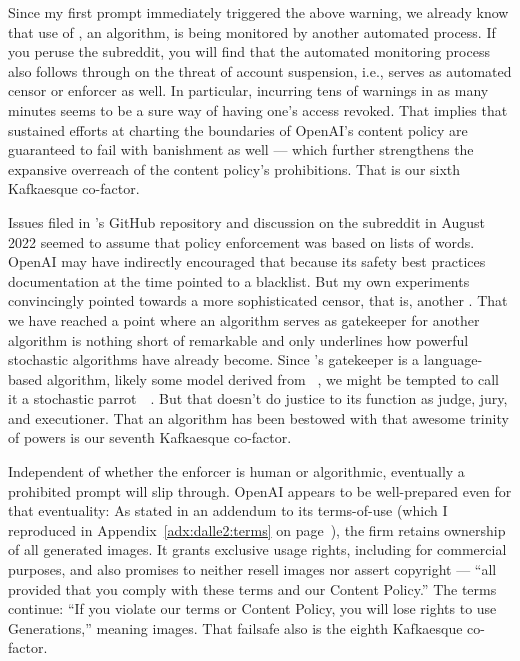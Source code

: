 Since my first prompt immediately triggered the above warning, we already know
that use of \DALLE, an algorithm, is being monitored by another automated
process. If you peruse the \DALLE{} subreddit, you will find that the automated
monitoring process also follows through on the threat of account suspension,
i.e., serves as automated censor or enforcer as well. In particular, incurring
tens of warnings in as many minutes seems to be a sure way of having one's
access revoked. That implies that sustained efforts at charting the boundaries
of OpenAI's content policy are guaranteed to fail with banishment as well —
which further strengthens the expansive overreach of the content policy's
prohibitions. That is our sixth Kafkaesque co-factor.

Issues filed in \DALLE's GitHub repository and discussion on the subreddit in
August 2022 seemed to assume that policy enforcement was based on lists of
words. OpenAI may have indirectly encouraged that because its safety best
practices documentation at the time pointed to a  blacklist. But my own
experiments convincingly pointed towards a more sophisticated censor, that is,
another \AI. That we have reached a point where an algorithm serves as
gatekeeper for another algorithm is nothing short of remarkable and only
underlines how powerful stochastic algorithms have already become. Since
\DALLE's gatekeeper is a language-based algorithm, likely some model derived
from \GPT~\cite{BrownMannea2020}, we might be tempted to call it a stochastic
parrot~~\cite{BenderGebruea2021}. But that doesn't do justice to
its function as judge, jury, and executioner. That an algorithm has been
bestowed with that awesome trinity of powers is our seventh Kafkaesque
co-factor.

Independent of whether the enforcer is human or algorithmic, eventually a
prohibited prompt will slip through. OpenAI appears to be well-prepared even for
that eventuality: As stated in an addendum to its terms-of-use (which I
reproduced in Appendix~\ref{adx:dalle2:terms} on
page~\pageref{adx:dalle2:terms}), the firm retains ownership of all generated
images. It grants exclusive usage rights, including for commercial purposes, and
also promises to neither resell images nor assert copyright — ``all provided
that you comply with these terms and our Content Policy.'' The terms continue:
``If you violate our terms or Content Policy, you will lose rights to use
Generations,'' meaning images. That failsafe also is the eighth Kafkaesque
co-factor.

